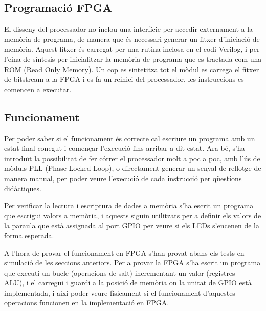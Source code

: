 \documentclass[10pt,a4paper,twocolumn,twoside]{article}
\begin{document}
    
    \subsection{Programació FPGA}
    El disseny del processador no inclou una interfície per accedir externament a la memòria de programa, de manera que és necessari generar un fitxer d'iniciació de memòria. Aquest fitxer és carregat per una rutina inclosa en el codi Verilog, i per l’eina de síntesis per inicialitzar la memòria de programa que es tractada com una ROM (Read Only Memory). Un cop es sintetitza tot el mòdul es carrega el fitxer de bitstream a la FPGA i es fa un reinici del processador, les instruccions es comencen a executar. 
    
    \subsection{Funcionament}
    
    Per poder saber si el funcionament és correcte cal escriure un programa amb un estat final conegut i començar l'execució fins arribar a dit estat.
    Ara bé, s’ha introduït la possibilitat de fer córrer el processador molt a poc a poc, amb l'ús de mòduls PLL (Phase-Locked Loop), o directament generar un senyal de rellotge de manera manual, per poder veure l’execució de cada instrucció per qüestions didàctiques.
    
    Per verificar la lectura i escriptura de dades a memòria s'ha escrit un programa que escrigui valors a memòria, i aquests siguin utilitzats per a definir els valors de la paraula que està assignada al port GPIO per veure si els LEDs s'encenen de la forma esperada.
    
    A l'hora de provar el funcionament en FPGA s'han provat abans els tests en simulació de les seccions anteriors.
    Per a provar la FPGA s'ha escrit un programa que executi un bucle (operacions de salt) incrementant un valor (registres + ALU), i el carregui i guardi a la posició de memòria on la unitat de GPIO està implementada, i així poder veure físicament si el funcionament d'aquestes operacions funcionen en la implementació en FPGA. 
\end{document}
